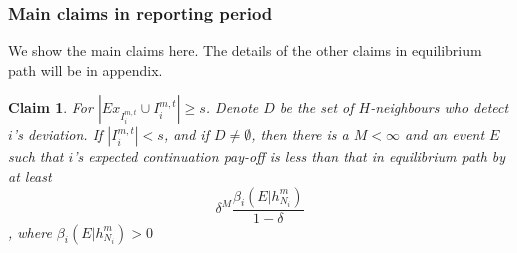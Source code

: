 \documentclass[12pt]{article}
\newtheorem{claim}{Claim}[subsubsection]
\theoremstyle{remark}
\theoremstyle{remark}
\begin{document}
\subsubsection{Main claims in reporting period}

We show the main claims here. The details of the other claims in equilibrium path will be in appendix.


\begin{claim} 
\label{claim_detection_reporting_period}
For $|Ex_{I^{m,t}_i}\cup I^{m,t}_i|\geq s$. Denote $D$ be the set of $H$-neighbours who detect $i$'s deviation. If $|I^{m,t}_i|<s$, and if $D\neq \emptyset$, then there is a $M<\infty$ and an event $E$ such that $i$'s expected continuation pay-off is less than that in equilibrium path by at least 
\[\delta^{M}\frac{\beta_{i}(E|h^{m}_{N_i})}{1-\delta}\]
, where $\beta_{i}(E|h^{m}_{N_i})>0$
\end{claim}
\end{document}
